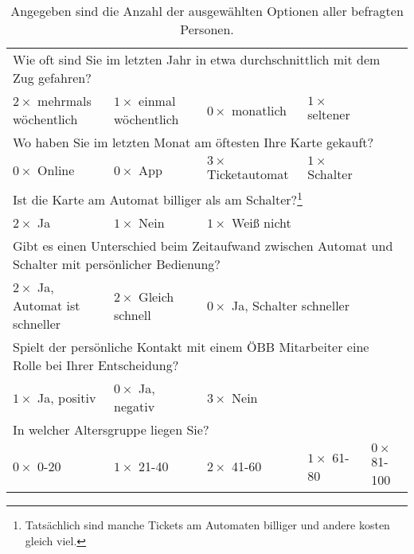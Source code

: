 \documentclass[]{article}
\begin{document}
\begin{table}
	\centering
	\label{tab:auswertung_single_choice}
	\begin{minipage}{\textwidth}
	\begin{tabular}{|lllll|}
		\hline
		\multicolumn{5}{|l|}{Wie oft sind Sie im letzten Jahr in etwa durchschnittlich mit dem Zug gefahren?}                      \\
		$2\times$ mehrmals wöchentlich & $1\times$ einmal wöchentlich & $0\times$ monatlich & $1\times$ seltener &                        \\ \hline
		\multicolumn{5}{|l|}{Wo haben Sie im letzten Monat am öftesten Ihre Karte gekauft?}                                        \\
		$0\times$ Online & $0\times$ App & $3\times$ Ticketautomat & $1\times$ Schalter &                                                 \\ \hline
		\multicolumn{5}{|l|}{Ist die Karte am Automat billiger als am Schalter?\footnote{Tatsächlich sind manche Tickets am Automaten billiger und andere kosten gleich viel.}} \\
		$2\times$ Ja & $1\times$ Nein & $1\times$ Weiß nicht &  &                                                                         \\ \hline
		\multicolumn{5}{|l|}{Gibt es einen Unterschied beim Zeitaufwand zwischen Automat und Schalter mit persönlicher Bedienung?} \\
		$2\times$ Ja, Automat ist schneller & $2\times$ Gleich schnell & \multicolumn{2}{l}{$0\times$ Ja, Schalter schneller} &            \\ \hline
		\multicolumn{5}{|l|}{Spielt der persönliche Kontakt mit einem ÖBB Mitarbeiter eine Rolle bei Ihrer Entscheidung?}          \\
		$1\times$ Ja, positiv & $0\times$ Ja, negativ & $3\times$ Nein &  &                                                               \\ \hline
		\multicolumn{5}{|l|}{In welcher Altersgruppe liegen Sie?}                                                                  \\
		$0\times$ 0-20 & $1\times$ 21-40 & $2\times$ 41-60 & $1\times$ 61-80 & $0\times$ 81-100                                           \\ \hline
	\end{tabular}
\end{minipage}
\caption{Angegeben sind die Anzahl der ausgewählten Optionen aller befragten Personen.}
\end{table}
\end{document}
